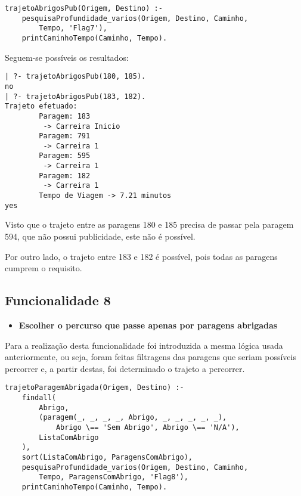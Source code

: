\documentclass[a4paper,12pt]{report}
\begin{document}
\begin{verbatim}
trajetoAbrigosPub(Origem, Destino) :-
    pesquisaProfundidade_varios(Origem, Destino, Caminho,
        Tempo, 'Flag7'),
    printCaminhoTempo(Caminho, Tempo).
\end{verbatim}

\vspace{0.5cm}

Seguem-se possíveis os resultados:

\begin{verbatim}
| ?- trajetoAbrigosPub(180, 185).
no
| ?- trajetoAbrigosPub(183, 182).
Trajeto efetuado: 
        Paragem: 183
         -> Carreira Inicio
        Paragem: 791
         -> Carreira 1
        Paragem: 595
         -> Carreira 1
        Paragem: 182
         -> Carreira 1
        Tempo de Viagem -> 7.21 minutos
yes
\end{verbatim}

\par Visto que o trajeto entre as paragens 180 e 185 precisa de passar pela paragem 594, que não possui publicidade, este não é possível.
\par Por outro lado, o trajeto entre 183 e 182 é possível, pois todas as paragens cumprem o requisito.

\vspace{10cm}

\subsection{Funcionalidade 8}
\begin{itemize}
    \item \textbf{Escolher o percurso que passe apenas por paragens abrigadas}
\end{itemize}
\par Para a realização desta funcionalidade foi introduzida a mesma lógica usada anteriormente, ou seja, foram feitas filtragens das paragens que seriam possíveis percorrer e, a partir destas, foi determinado o trajeto a percorrer.

\begin{verbatim}
trajetoParagemAbrigada(Origem, Destino) :-
    findall(
        Abrigo,
        (paragem(_, _, _, _, Abrigo, _, _, _, _, _),
            Abrigo \== 'Sem Abrigo', Abrigo \== 'N/A'),
        ListaComAbrigo
    ),
    sort(ListaComAbrigo, ParagensComAbrigo),                       
    pesquisaProfundidade_varios(Origem, Destino, Caminho,
        Tempo, ParagensComAbrigo, 'Flag8'),
    printCaminhoTempo(Caminho, Tempo).
\end{verbatim}
\end{document}
